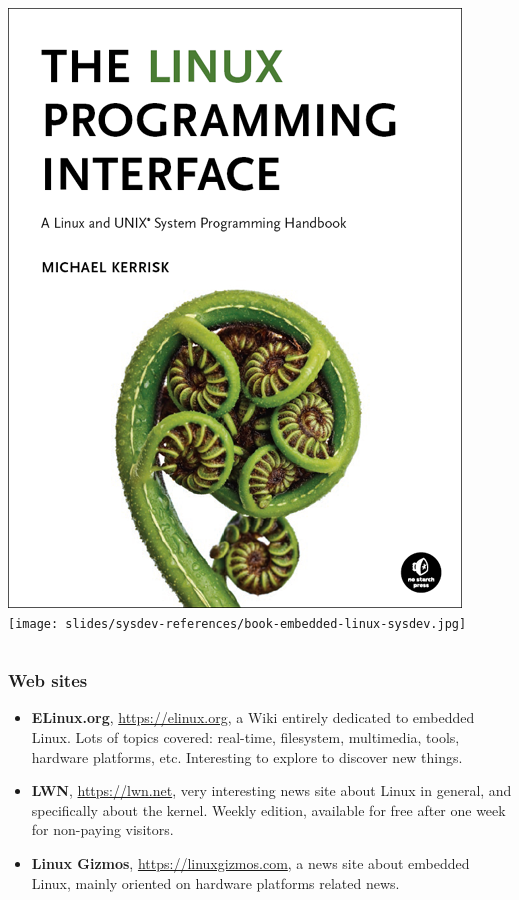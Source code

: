 \begin{frame}
\begin{columns}
    \includegraphics[height=0.25\textheight]{common/linux-programming-interface.png}\\
    \vspace{0.5cm}
    \texttt{[image: slides/sysdev-references/book-embedded-linux-sysdev.jpg]}\\
  \end{columns}
\end{frame}

\begin{frame}
  \frametitle{Web sites}
  \begin{itemize}
  \item {\bf ELinux.org}, \url{https://elinux.org}, a Wiki entirely
    dedicated to embedded Linux. Lots of topics covered: real-time,
    filesystem, multimedia, tools, hardware platforms,
    etc. Interesting to explore to discover new things.
  \item {\bf LWN}, \url{https://lwn.net}, very interesting news site
    about Linux in general, and specifically about the kernel. Weekly
    edition, available for free after one week for non-paying
    visitors.
  \item {\bf Linux Gizmos}, \url{https://linuxgizmos.com}, a news site
    about embedded Linux, mainly oriented on hardware platforms
    related news.
  \end{itemize}
\end{frame}

